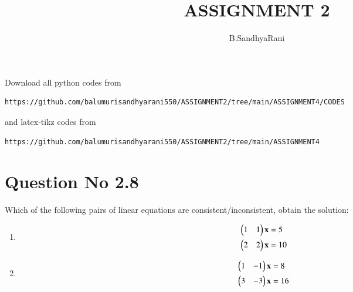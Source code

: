 \documentclass[journal,12pt,twocolumn]{IEEEtran}
\begin{document}
     \def\rightbox#1{\makebox[0in][r]{#1}}
     \def\centbox#1{\makebox[0in]{#1}}
     \def\topbox#1{\raisebox{-\baselineskip}[0in][0in]{#1}}
     \def\midbox#1{\raisebox{-0.5\baselineskip}[0in][0in]{#1}}
\vspace{3cm}
\title{ASSIGNMENT 2}
\author{B.SandhyaRani}
\maketitle
\newpage
\bigskip
\renewcommand{\thefigure}{\theenumi}
\renewcommand{\thetable}{\theenumi}
Download all python codes from 
\begin{lstlisting}
https://github.com/balumurisandhyarani550/ASSIGNMENT2/tree/main/ASSIGNMENT4/CODES
\end{lstlisting}
%
and latex-tikz codes from 
%
\begin{lstlisting}
https://github.com/balumurisandhyarani550/ASSIGNMENT2/tree/main/ASSIGNMENT4
\end{lstlisting}
%
\section{Question No 2.8}
Which of the following pairs of linear equations are consistent/inconsistent, obtain the solution:
%
\begin{enumerate}
\item
\begin{align}
\begin{split}
\begin{pmatrix}1 & 1 \end{pmatrix}\mathbf{x}&=5
\\
\begin{pmatrix}2 & 2 \end{pmatrix}\mathbf{x}&=10 \label{1.0.1}
\end{split}
\end{align}
\item
\begin{align}
\begin{split}
\begin{pmatrix}1 & -1 \end{pmatrix}\mathbf{x}&=8
\\
\begin{pmatrix}3 & -3 \end{pmatrix}\mathbf{x}&=16 \label{1.0.2}
\end{split}
\end{align}
\end{enumerate}
%
\end{document}
